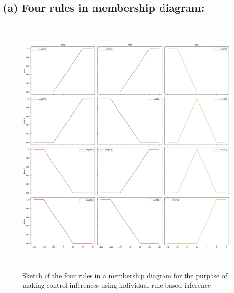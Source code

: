 \documentclass{tron}
\begin{document}
\subsection{(a) Four rules in membership diagram:}
\begin{figure}[H]
	\centering
	\includegraphics[height=500px]{../src_code/output/P6/plot_Rule-Based Inference}
	\caption{Sketch of the four rules in a membership diagram for the purpose of making control inferences using individual rule-based inference}
	\label{fig:p5:n}
\end{figure}
\end{document}
